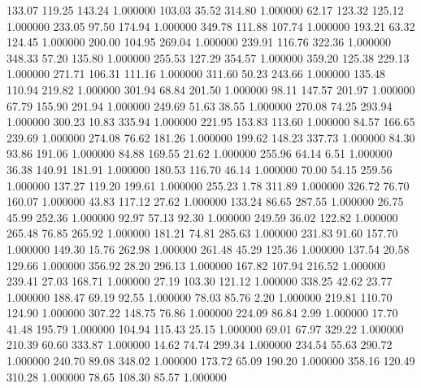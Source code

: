     133.07    119.25    143.24  1.000000
    103.03     35.52    314.80  1.000000
     62.17    123.32    125.12  1.000000
    233.05     97.50    174.94  1.000000
    349.78    111.88    107.74  1.000000
    193.21     63.32    124.45  1.000000
    200.00    104.95    269.04  1.000000
    239.91    116.76    322.36  1.000000
    348.33     57.20    135.80  1.000000
    255.53    127.29    354.57  1.000000
    359.20    125.38    229.13  1.000000
    271.71    106.31    111.16  1.000000
    311.60     50.23    243.66  1.000000
    135.48    110.94    219.82  1.000000
    301.94     68.84    201.50  1.000000
     98.11    147.57    201.97  1.000000
     67.79    155.90    291.94  1.000000
    249.69     51.63     38.55  1.000000
    270.08     74.25    293.94  1.000000
    300.23     10.83    335.94  1.000000
    221.95    153.83    113.60  1.000000
     84.57    166.65    239.69  1.000000
    274.08     76.62    181.26  1.000000
    199.62    148.23    337.73  1.000000
     84.30     93.86    191.06  1.000000
     84.88    169.55     21.62  1.000000
    255.96     64.14      6.51  1.000000
     36.38    140.91    181.91  1.000000
    180.53    116.70     46.14  1.000000
     70.00     54.15    259.56  1.000000
    137.27    119.20    199.61  1.000000
    255.23      1.78    311.89  1.000000
    326.72     76.70    160.07  1.000000
     43.83    117.12     27.62  1.000000
    133.24     86.65    287.55  1.000000
     26.75     45.99    252.36  1.000000
     92.97     57.13     92.30  1.000000
    249.59     36.02    122.82  1.000000
    265.48     76.85    265.92  1.000000
    181.21     74.81    285.63  1.000000
    231.83     91.60    157.70  1.000000
    149.30     15.76    262.98  1.000000
    261.48     45.29    125.36  1.000000
    137.54     20.58    129.66  1.000000
    356.92     28.20    296.13  1.000000
    167.82    107.94    216.52  1.000000
    239.41     27.03    168.71  1.000000
     27.19    103.30    121.12  1.000000
    338.25     42.62     23.77  1.000000
    188.47     69.19     92.55  1.000000
     78.03     85.76      2.20  1.000000
    219.81    110.70    124.90  1.000000
    307.22    148.75     76.86  1.000000
    224.09     86.84      2.99  1.000000
     17.70     41.48    195.79  1.000000
    104.94    115.43     25.15  1.000000
     69.01     67.97    329.22  1.000000
    210.39     60.60    333.87  1.000000
     14.62     74.74    299.34  1.000000
    234.54     55.63    290.72  1.000000
    240.70     89.08    348.02  1.000000
    173.72     65.09    190.20  1.000000
    358.16    120.49    310.28  1.000000
     78.65    108.30     85.57  1.000000
